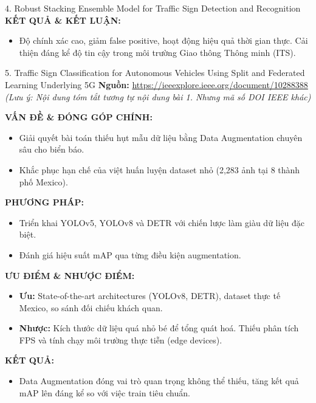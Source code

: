 \documentclass[12pt,a4paper]{article}
\newcommand{\subheading}[1]{\vspace{0.3cm}\noindent\textbf{\textcolor{primary}{\MakeUppercase{#1}:}}\par\vspace{0.1cm}}
\begin{document}
\begin{paperbox}{4. Robust Stacking Ensemble Model for Traffic Sign Detection and Recognition}
    \subheading{Kết quả \& Kết luận}
    \begin{itemize}
        \item Độ chính xác cao, giảm false positive, hoạt động hiệu quả thời gian thực. Cải thiện đáng kể độ tin cậy trong môi trường Giao thông Thông minh (ITS).
    \end{itemize}
\end{paperbox}

\vspace{0.5cm}

\begin{paperbox}{5. Traffic Sign Classification for Autonomous Vehicles Using Split and Federated Learning Underlying 5G}
    \textbf{Nguồn:} \url{https://ieeexplore.ieee.org/document/10288388}\\
    \textit{(Lưu ý: Nội dung tóm tắt tương tự nội dung bài 1. Nhưng mã số DOI IEEE khác)}

    \subheading{Vấn đề \& Đóng góp chính}
    \begin{itemize}
        \item Giải quyết bài toán thiếu hụt mẫu dữ liệu bằng Data Augmentation chuyên sâu cho biển báo.
        \item Khắc phục hạn chế của việt huấn luyện dataset nhỏ (2,283 ảnh tại 8 thành phố Mexico).
    \end{itemize}

    \subheading{Phương pháp}
    \begin{itemize}
        \item Triển khai YOLOv5, YOLOv8 và DETR với chiến lược làm giàu dữ liệu đặc biệt.
        \item Đánh giá hiệu suất mAP qua từng điều kiện augmentation.
    \end{itemize}

    \subheading{Ưu điểm \& Nhược điểm}
    \begin{itemize}
        \item \textbf{Ưu:} State-of-the-art architectures (YOLOv8, DETR), dataset thực tế Mexico, so sánh đối chiếu khách quan.
        \item \textbf{Nhược:} Kích thước dữ liệu quá nhỏ bé để tổng quát hoá. Thiếu phân tích FPS và tính chạy môi trường thực tiễn (edge devices).
    \end{itemize}

    \subheading{Kết quả}
    \begin{itemize}
        \item Data Augmentation đóng vai trò quan trọng không thể thiếu, tăng kết quả mAP lên đáng kể so với việc train tiêu chuẩn.
    \end{itemize}
\end{paperbox}
\end{document}
